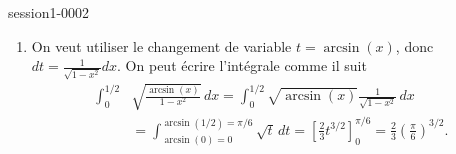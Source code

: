 \begin{corrige}{session1-0002}
\begin{enumerate}
  \item  On veut utiliser le changement de variable $t = \arcsin(x)$, donc $dt = \frac{1}{\sqrt{1-x^2}} dx $. On peut \'ecrire l'int\'egrale comme il suit 
    \begin{equation*}
      \begin{aligned}
        \int_{0}^{1/2} & \sqrt{\frac{\arcsin(x)}{1-x^2}}\, dx = \int_{0}^{1/2}\sqrt{\arcsin(x)} \frac{1}{\sqrt{1-x^2}}\, dx\\
        &= \int_{\arcsin(0)=0}^{\arcsin(1/2) = \pi/6} \sqrt{t} \,dt = \left[\frac{2}{3}t^{3/2}\right]_0^{\pi/6} = \frac{2}{3}\left(\frac{\pi}{6}\right)^{3/2}. 
      \end{aligned}
    \end{equation*}
  \end{enumerate}

\end{corrige}
